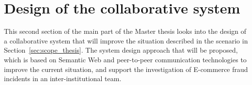 
\chapter{Design of the collaborative system} %
\label{cha:system_design}

This second section of the main part of the Master thesis looks into the design of a collaborative system that will improve the situation described in the scenario in Section~\ref{sec:scope_thesis}. The system design approach that will be proposed, which is based on Semantic Web and peer-to-peer communication technologies to improve the current situation, and support the investigation of E-commerce fraud incidents in an inter-institutional team.



